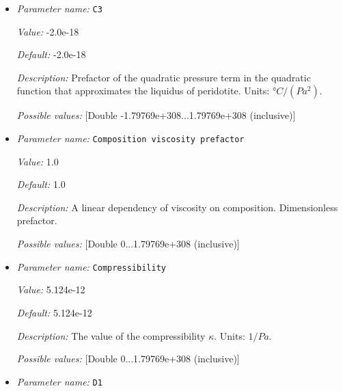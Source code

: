 \begin{itemize}
{\it Value:} 4.50e-8


{\it Default:} 4.50e-8


{\it Description:} Prefactor of the linear pressure term in the quadratic function that approximates the liquidus of peridotite. Units: $°C/Pa$.


{\it Possible values:} [Double -1.79769e+308...1.79769e+308 (inclusive)]
\item {\it Parameter name:} {\tt C3}
\label{parameters:Material model/Latent heat melt/C3}


{\it Value:} -2.0e-18


{\it Default:} -2.0e-18


{\it Description:} Prefactor of the quadratic pressure term in the quadratic function that approximates the liquidus of peridotite. Units: $°C/(Pa^2)$.


{\it Possible values:} [Double -1.79769e+308...1.79769e+308 (inclusive)]
\item {\it Parameter name:} {\tt Composition viscosity prefactor}
\label{parameters:Material model/Latent heat melt/Composition viscosity prefactor}


{\it Value:} 1.0


{\it Default:} 1.0


{\it Description:} A linear dependency of viscosity on composition. Dimensionless prefactor.


{\it Possible values:} [Double 0...1.79769e+308 (inclusive)]
\item {\it Parameter name:} {\tt Compressibility}
\label{parameters:Material model/Latent heat melt/Compressibility}


{\it Value:} 5.124e-12


{\it Default:} 5.124e-12


{\it Description:} The value of the compressibility $\kappa$. Units: $1/Pa$.


{\it Possible values:} [Double 0...1.79769e+308 (inclusive)]
\item {\it Parameter name:} {\tt D1}
\label{parameters:Material model/Latent heat melt/D1}



\end{itemize}
